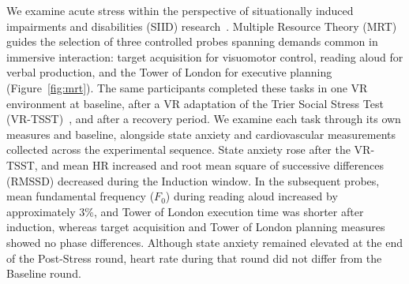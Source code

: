 

We examine acute stress within the perspective of situationally induced impairments and disabilities (SIID) research~\citep{sears2003computers,sarsenbayeva2019measuring}. Multiple Resource Theory (MRT)~\citep{wickens2008multiple} guides the selection of three controlled probes spanning demands common in immersive interaction: target acquisition for visuomotor control, reading aloud for verbal production, and the Tower of London for executive planning (Figure~\ref{fig:mrt}). The same participants completed these tasks in one VR environment at baseline, after a VR adaptation of the Trier Social Stress Test (VR-TSST)~\citep{liszio2018relaxing}, and after a recovery period. We examine each task through its own measures and baseline, alongside state anxiety and cardiovascular measurements collected across the experimental sequence.
State anxiety rose after the VR-TSST, and mean HR increased and root mean square of successive differences (RMSSD) decreased during the Induction window. In the subsequent probes, mean fundamental frequency ($F_0$) during reading aloud increased by approximately 3\%, and Tower of London execution time was shorter after induction, whereas target acquisition and Tower of London planning measures showed no phase differences. Although state anxiety remained elevated at the end of the Post-Stress round, heart rate during that round did not differ from the Baseline round.


